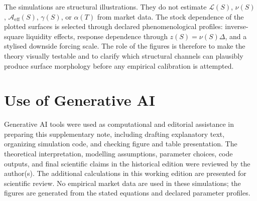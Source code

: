 \documentclass[11pt]{article}
\newcommand{\Aeff}{\mathcal A_{\mathrm{eff}}}
\newcommand{\Liq}{\mathcal L}
\begin{document}
The simulations are structural illustrations. They do not estimate
\(\Liq(S)\), \(\nu(S)\), \(\Aeff(S)\), \(\gamma(S)\), or \(\alpha(T)\) from
market data. The stock dependence of the plotted surfaces is selected through
declared phenomenological profiles: inverse-square liquidity effects,
response dependence through \(z(S)=\nu(S)\Delta\), and a stylised downside
forcing scale. The role of the figures is therefore to make the theory
visually testable and to clarify which structural channels can plausibly
produce surface morphology before any empirical calibration is attempted.

\section*{Use of Generative AI}

Generative AI tools were used as computational and editorial assistance in
preparing this supplementary note, including drafting explanatory text,
organizing simulation code, and checking figure and table presentation. The
theoretical interpretation, modelling assumptions, parameter choices, code
outputs, and final scientific claims in the historical edition were reviewed by the author(s). The additional calculations in this working edition are presented for scientific review. No empirical market data are used in
these simulations; the figures are generated from the stated equations and
declared parameter profiles.
\end{document}

